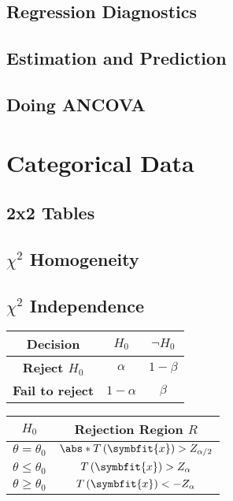 \documentclass{article}
\begin{document}
\begin{multicols}{3}
\subsection{Regression Diagnostics}
\subsection{Estimation and Prediction}
\subsection{Doing ANCOVA}
\section{Categorical Data}
\subsection{2x2 Tables}
\subsection{\texorpdfstring{\(\chi^2\)}{Chi-Squared} Homogeneity}
\subsection{\texorpdfstring{\(\chi^2\)}{Chi-Squared} Independence}

\begin{minipage}{70mm}
\begin{table}[H]
    \centering
    \begin{tabular}{c|cc}
        \toprule
        \textbf{Decision}                  & \textbf{\(H_0\)}       & \textbf{\(\lnot H_0\)}      \\
        \midrule
        \textbf{Reject \(H_0\)}            & \(\alpha\)  & \(1 - \beta\)           \\
        \textbf{Fail to reject} & \(1 - \alpha\)                 & \(\beta\)  \\
        \bottomrule
    \end{tabular}
\end{table}
\end{minipage}

\begin{minipage}{70mm}
\begin{table}[H]
    \centering
    \begin{tabular}{cc}
        \toprule
        \(H_0\) & \textbf{Rejection Region} \(R\)                       \\
        \midrule
        \(\theta = \theta_0\)            & \(\abs*{T\left( \symbfit{x} \right)} > Z_{\alpha/2}\) \\
        \(\theta \leq \theta_0\)         & \(T\left( \symbfit{x} \right) > Z_{\alpha}\)          \\
        \(\theta \geq \theta_0\)         & \(T\left( \symbfit{x} \right) < -Z_{\alpha}\)         \\
        \bottomrule
    \end{tabular}
\end{table}
\end{minipage}


\end{multicols}
\end{document}
